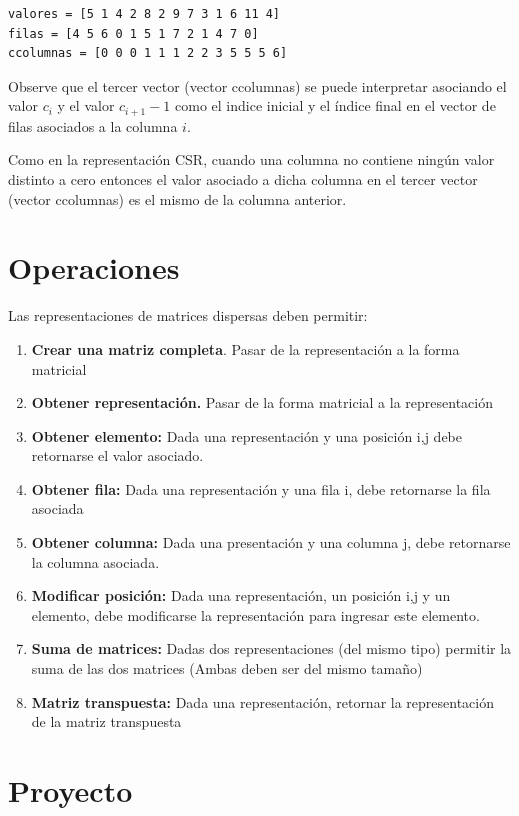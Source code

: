 \documentclass[onecolumn]{article}
\begin{document}
\begin{lstlisting}
valores = [5 1 4 2 8 2 9 7 3 1 6 11 4]
filas = [4 5 6 0 1 5 1 7 2 1 4 7 0]
ccolumnas = [0 0 0 1 1 1 2 2 3 5 5 5 6]
\end{lstlisting}

Observe que el tercer vector (vector ccolumnas) se puede interpretar asociando el valor $c_i$ y el valor
$c_{i+1}-1$ como el indice inicial y el índice final en el vector de filas asociados a la columna $i$. 

Como en la representación CSR, cuando una columna no contiene ningún valor distinto a cero entonces el
valor asociado a dicha columna en el tercer vector (vector ccolumnas) es el mismo de la columna anterior.


\section{Operaciones}

Las representaciones de matrices dispersas deben permitir:

\begin{enumerate}
	\item \textbf{Crear una matriz completa}. Pasar de la representación a la forma matricial
	\item \textbf{Obtener representación.} Pasar de la forma matricial a la representación
	\item \textbf{Obtener elemento:} Dada una representación y una posición i,j debe retornarse el valor asociado.
	\item \textbf{Obtener fila:} Dada una representación y una fila i, debe retornarse la fila asociada
	\item \textbf{Obtener columna:} Dada una presentación y una columna j, debe retornarse la columna asociada.
	\item \textbf{Modificar posición:} Dada una representación, un posición i,j y un elemento, debe modificarse la representación para ingresar este elemento.
	\item \textbf{Suma de matrices:} Dadas dos representaciones (del mismo tipo) permitir la suma de las dos matrices (Ambas deben ser del mismo tamaño)
	\item \textbf{Matriz transpuesta:} Dada una representación, retornar la representación de la matriz transpuesta
\end{enumerate}

\section{Proyecto}
\end{document}
